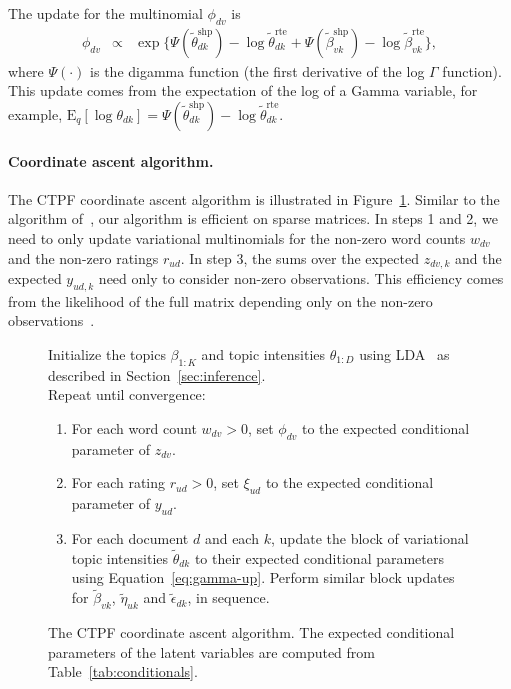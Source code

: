 \documentclass{article}
\newcommand{\mysec}[1]{Section~\ref{sec:#1}}
\newcommand{\myeq}[1]{Equation~\ref{eq:#1}}
\newcommand{\myfig}[1]{Figure~\ref{fig:#1}}
\newcommand{\mytab}[1]{Table~\ref{tab:#1}}
\newcommand{\E}{\textrm{E}}
\newcommand{\shape}{\textrm{shp}}
\newcommand{\rate}{\textrm{rte}}
\newcommand{\vshape}[2]{\tilde{#1}_{#2}^{\shape}}
\newcommand{\vrate}[2]{\tilde{#1}_{#2}^{\rate}}
\begin{document}
The update for the multinomial $\phi_{dv}$ is
\begin{eqnarray}
  \phi_{dv} & \propto & \exp\{\Psi(\vshape{\theta}{dk}) - \log \vrate{\theta}{dk}
+ \Psi(\vshape{\beta}{vk}) - \log \vrate{\beta}{vk} \},
\label{eq:mult-up}
\end{eqnarray}
where $\Psi(\cdot)$ is the digamma function (the first derivative of
the log $\Gamma$ function).  This update comes from the expectation of
the log of a Gamma variable, for example, $\E_q[\log \theta_{dk}] =
\Psi(\vshape{\theta}{dk}) - \log \vrate{\theta}{dk}$.

\paragraph{Coordinate ascent algorithm.}
The CTPF coordinate ascent algorithm is illustrated in
\myfig{batch}. Similar to the algorithm of~\cite{Gopalan:2013b}, our
algorithm is efficient on sparse matrices. In steps 1 and 2, we need to only
update variational multinomials for the non-zero word counts $w_{dv}$
and the non-zero ratings $r_{ud}$.  In step 3, the sums over
the expected $z_{dv,k}$ and the expected $y_{ud,k}$ need only to
consider non-zero observations. This efficiency comes from the
likelihood of the full matrix depending only on the non-zero
observations~\cite{Gopalan:2013b}.
\begin{figure}
\begin{framed}
Initialize the topics $\beta_{1:K}$ and topic intensities
$\theta_{1:D}$ using LDA~\cite{Blei:2003b} as described in
\mysec{inference}.\\ Repeat until convergence:
\begin{enumerate}
\item For each word count $w_{dv} > 0$, set $\phi_{dv}$ to the expected
  conditional parameter of $z_{dv}$.
\item For each rating $r_{ud} > 0$, set $\xi_{ud}$ to the expected
  conditional parameter of $y_{ud}$.
\item For each document $d$ and each $k$, update the block of
  variational topic intensities $\tilde{\theta}_{dk}$ to their
  expected conditional parameters using \myeq{gamma-up}. Perform
  similar block updates for $\tilde{\beta}_{vk}$, $\tilde{\eta}_{uk}$
  and $\tilde{\epsilon}_{dk}$, in sequence.
\end{enumerate}
\end{framed}
\caption{The CTPF coordinate ascent algorithm. The expected
  conditional parameters of the latent variables are computed from
  \mytab{conditionals}.}
\label{fig:batch}
\end{figure}
\end{document}
